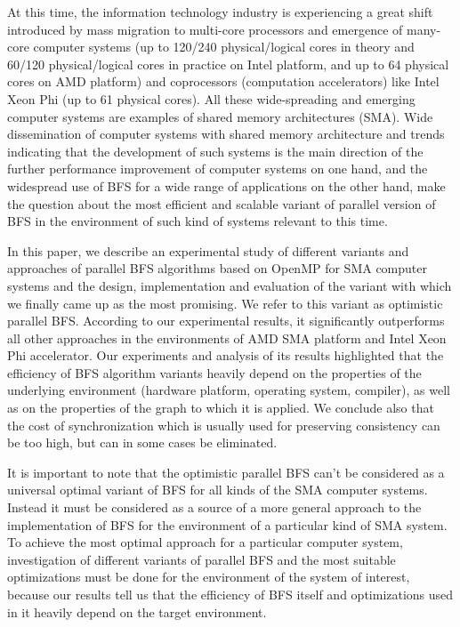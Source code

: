 \documentclass[letterpaper]{article}
\begin{document}
		At this time, the information technology industry is experiencing a great shift introduced by mass migration to multi-core processors and emergence of many-core computer systems (up to 120/240 physical/logical cores in theory and 60/120 physical/logical cores in practice on Intel platform, and up to 64 physical cores on AMD platform) and coprocessors (computation accelerators) like Intel Xeon Phi (up to 61 physical cores).
		All these wide-spreading and emerging computer systems are examples of shared memory architectures (SMA).
		Wide dissemination of computer systems with shared memory architecture and trends indicating that the development of such systems is the main direction of the further performance improvement of computer systems on one hand, and the widespread use of BFS for a wide range of applications on the other hand, make the question about the most efficient and scalable variant of parallel version of BFS in the environment of such kind of systems relevant to this time.
		
		In this paper, we describe an experimental study of different variants and approaches of parallel BFS algorithms based on OpenMP for SMA computer systems and the design, implementation and evaluation of the variant with which we finally came up as the most promising.
		We refer to this variant as optimistic parallel BFS.
		According to our experimental results, it significantly outperforms all other approaches in the environments of AMD SMA platform and Intel Xeon Phi accelerator.
		Our experiments and analysis of its results highlighted that the efficiency of BFS algorithm variants heavily depend on the properties of the underlying environment (hardware platform, operating system, compiler), as well as on the properties of the graph to which it is applied.
		We conclude also that the cost of synchronization which is usually used for preserving consistency can be too high, but can in some cases be eliminated.
		
		It is important to note that the optimistic parallel BFS can't be considered as a universal optimal variant of BFS for all kinds of the SMA computer systems.
		Instead it must be considered as a source of a more general approach to the implementation of BFS for the environment of a particular kind of SMA system.
		To achieve the most optimal approach for a particular computer system, investigation of different variants of parallel BFS and the most suitable optimizations must be done for the environment of the system of interest, because our results tell us that the efficiency of BFS itself and optimizations used in it heavily depend on the target environment. 
	
\end{document}
